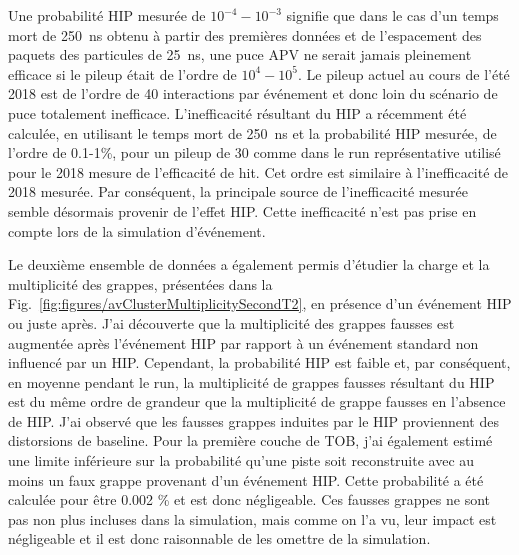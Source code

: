 Une probabilité HIP mesurée de $10^{-4}-10^{-3}$ signifie que dans le cas d'un temps mort de 250~ns obtenu à partir des premières données et de l'espacement des paquets des particules de 25~ns, une puce APV ne serait jamais pleinement efficace si le pileup était de l'ordre de $10^4 - 10^5$. Le pileup actuel au cours de l'été 2018 est de l'ordre de 40 interactions par événement et donc loin du scénario de puce totalement inefficace. L'inefficacité résultant du HIP a récemment été calculée, en utilisant le temps mort de 250~ns et la probabilité HIP mesurée, de l'ordre de 0.1-1\%, pour un pileup de 30 comme dans le run représentative utilisé pour le 2018 mesure de l'efficacité de hit. Cet ordre est similaire à l'inefficacité de 2018 mesurée. Par conséquent, la principale source de l’inefficacité mesurée semble désormais provenir de l’effet HIP. Cette inefficacité n'est pas prise en compte lors de la simulation d'événement.


Le deuxième ensemble de données a également permis d'étudier la charge et la multiplicité des grappes, présentées dans la Fig.~\ref{fig:figures/avClusterMultiplicitySecondT2}, en présence d'un événement HIP ou juste après. J'ai découverte que la multiplicité des grappes fausses est augmentée après l'événement HIP par rapport à un événement standard non influencé par un HIP. Cependant, la probabilité HIP est faible et, par conséquent, en moyenne pendant le run, la multiplicité de grappes fausses résultant du HIP est du même ordre de grandeur que la multiplicité de grappe fausses en l'absence de HIP. J'ai observé que les fausses grappes induites par le HIP proviennent des distorsions de baseline. Pour la première couche de TOB, j'ai également estimé une limite inférieure sur la probabilité qu'une piste soit reconstruite avec au moins un faux grappe provenant d'un événement HIP. Cette probabilité a été calculée pour être 0.002 \% et est donc négligeable. Ces fausses grappes ne sont pas non plus incluses dans la simulation, mais comme on l’a vu, leur impact est négligeable et il est donc raisonnable de les omettre de la simulation.


